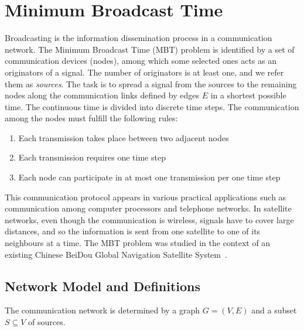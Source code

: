 \chapter{Minimum Broadcast Time}\label{sec:mbt}

Broadcasting is the information dissemination process in a communication network.
The Minimum Broadcast Time (MBT) problem is identified by a set of communication devices (nodes), among which some selected ones acts as an originators of a signal.
The number of originators is at least one, and we refer them as \emph{sources}.
The task is to spread a signal from the sources to the remaining nodes along the communication links defined by edges $E$ in a shortest possible time.
The continuous time is divided into discrete time steps.
The communication among the nodes must fulfill the following rules:
\begin{enumerate}
\item Each transmission takes place between two adjacent nodes
\item Each transmission requires one time step
\item Each node can participate in at most one transmission per one time step
\end{enumerate}

This communication protocol appears in various practical applications such as communication among computer processors and telephone networks.
In satellite networks, even though the communication is wireless, signals have to cover large distances, 
and so the information is sent from one satellite to one of its neighbours at a time.
The MBT problem was studied in the context of an existing Chinese BeiDou Global Navigation Satellite System~\cite{chu17}.

\section{Network Model and Definitions}

The communication network is determined by a graph $G=(V,E)$ and a subset $S\subseteq V$ of sources.

